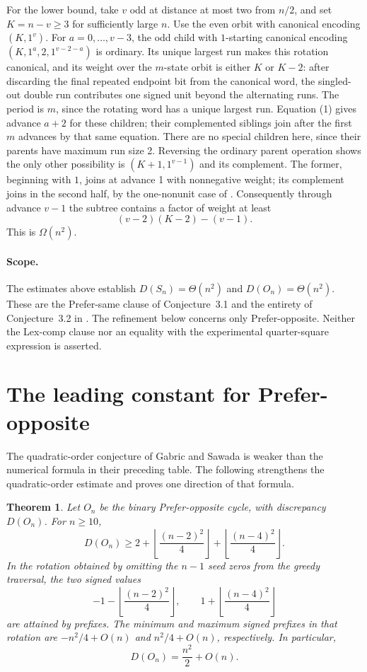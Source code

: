 \documentclass[11pt]{article}
\newtheorem{theorem}{Theorem}
\begin{document}
For the lower bound, take \(v\) odd at distance at most
two from \(n/2\), and set \(K=n-v\ge3\) for sufficiently
large \(n\). Use the even orbit with canonical encoding
\((K,1^v)\). For \(a=0,\ldots,v-3\), the odd child with
\(1\)-starting canonical encoding
\((K,1^a,2,1^{v-2-a})\) is ordinary. Its unique largest
run makes this rotation canonical, and its weight over
the \(m\)-state orbit is either \(K\) or \(K-2\):
after discarding the final repeated endpoint bit from
the canonical word, the singled-out double run contributes
one signed unit beyond the alternating runs. The period
is \(m\), since the rotating word has a unique largest
run. Equation (1) gives advance \(a+2\) for these children;
their complemented siblings join after the first \(m\)
advances by that same equation. There are no special
children here, since their parents have maximum run
size 2. Reversing the ordinary parent operation shows
the only other possibility is \((K+1,1^{v-1})\) and its
complement. The former, beginning with \(1\), joins at
advance 1 with nonnegative weight; its complement joins
in the second half, by the one-nonunit case of
\cite[Section 10]{SalaSawadaAlhakim}. Consequently through advance
\(v-1\) the subtree contains a factor of weight at least
\[
 (v-2)(K-2)-(v-1).
\]
This is \(\Omega(n^2)\).

\paragraph{Scope.}
The estimates above establish \(D(S_n)=\Theta(n^2)\) and
\(D(O_n)=\Theta(n^2)\). These are the Prefer-same clause of
Conjecture~3.1 and the entirety of Conjecture~3.2 in
\cite{GabricSawada}. The refinement below concerns only
Prefer-opposite. Neither the Lex-comp clause nor an equality
with the experimental quarter-square expression is asserted.

\section{The leading constant for Prefer-opposite}\label{sec:prefer-opposite-refinement}

The quadratic-order conjecture of Gabric and Sawada \cite[Conjecture~3.2]{GabricSawada} is weaker than the numerical formula in their preceding table. The following strengthens the quadratic-order estimate and proves one direction of that formula.

\begin{theorem}\label{thm:prefer-opposite-leading-constant}
Let \(O_n\) be the binary Prefer-opposite cycle, with discrepancy \(D(O_n)\). For \(n\ge10\),
\[
  D(O_n)\ge
  2+\left\lfloor\frac{(n-2)^2}{4}\right\rfloor
    +\left\lfloor\frac{(n-4)^2}{4}\right\rfloor.
\]
In the rotation obtained by omitting the \(n-1\) seed zeros from the greedy traversal, the two signed values
\[
  -1-\left\lfloor\frac{(n-2)^2}{4}\right\rfloor,
  \qquad
  1+\left\lfloor\frac{(n-4)^2}{4}\right\rfloor
\]
are attained by prefixes. The minimum and maximum signed prefixes in that rotation are \(-n^2/4+O(n)\) and \(n^2/4+O(n)\), respectively. In particular,
\[
  D(O_n)=\frac{n^2}{2}+O(n).
\]
\end{theorem}
\end{document}
